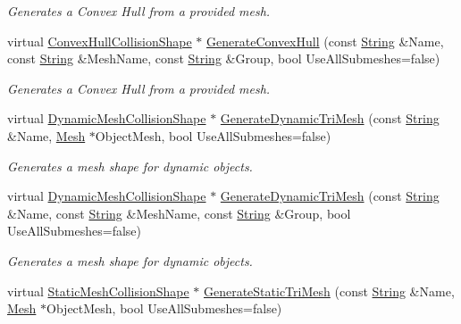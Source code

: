 \begin{DoxyCompactItemize}
\begin{DoxyCompactList}\small\item\em Generates a Convex Hull from a provided mesh. \item\end{DoxyCompactList}\item 
virtual \hyperlink{classphys_1_1ConvexHullCollisionShape}{ConvexHullCollisionShape} $\ast$ \hyperlink{classphys_1_1CollisionShapeManager_a3f2c32e311f8b88ebd57b5ae88ff072b}{GenerateConvexHull} (const \hyperlink{namespacephys_aa03900411993de7fbfec4789bc1d392e}{String} \&Name, const \hyperlink{namespacephys_aa03900411993de7fbfec4789bc1d392e}{String} \&MeshName, const \hyperlink{namespacephys_aa03900411993de7fbfec4789bc1d392e}{String} \&Group, bool UseAllSubmeshes=false)
\begin{DoxyCompactList}\small\item\em Generates a Convex Hull from a provided mesh. \item\end{DoxyCompactList}\item 
virtual \hyperlink{classphys_1_1DynamicMeshCollisionShape}{DynamicMeshCollisionShape} $\ast$ \hyperlink{classphys_1_1CollisionShapeManager_a2a1312694646ef42affbdded229033a7}{GenerateDynamicTriMesh} (const \hyperlink{namespacephys_aa03900411993de7fbfec4789bc1d392e}{String} \&Name, \hyperlink{classphys_1_1Mesh}{Mesh} $\ast$ObjectMesh, bool UseAllSubmeshes=false)
\begin{DoxyCompactList}\small\item\em Generates a mesh shape for dynamic objects. \item\end{DoxyCompactList}\item 
virtual \hyperlink{classphys_1_1DynamicMeshCollisionShape}{DynamicMeshCollisionShape} $\ast$ \hyperlink{classphys_1_1CollisionShapeManager_a23d878a6b9d1ff161574a4efab089c3b}{GenerateDynamicTriMesh} (const \hyperlink{namespacephys_aa03900411993de7fbfec4789bc1d392e}{String} \&Name, const \hyperlink{namespacephys_aa03900411993de7fbfec4789bc1d392e}{String} \&MeshName, const \hyperlink{namespacephys_aa03900411993de7fbfec4789bc1d392e}{String} \&Group, bool UseAllSubmeshes=false)
\begin{DoxyCompactList}\small\item\em Generates a mesh shape for dynamic objects. \item\end{DoxyCompactList}\item 
virtual \hyperlink{classphys_1_1StaticMeshCollisionShape}{StaticMeshCollisionShape} $\ast$ \hyperlink{classphys_1_1CollisionShapeManager_a8335ab3bd75383516586c8ea35bb8264}{GenerateStaticTriMesh} (const \hyperlink{namespacephys_aa03900411993de7fbfec4789bc1d392e}{String} \&Name, \hyperlink{classphys_1_1Mesh}{Mesh} $\ast$ObjectMesh, bool UseAllSubmeshes=false)

\end{DoxyCompactItemize}
